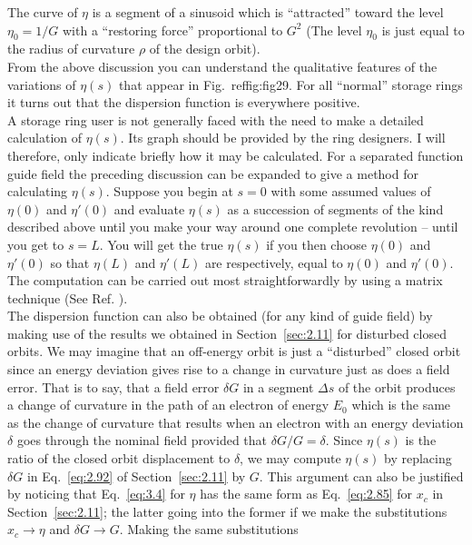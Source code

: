 The curve of $\eta$ is a segment of a sinusoid which is ``attracted'' toward the level
$\eta_0 = 1/G$ with a ``restoring force'' proportional to $G^2$ (The level $\eta_0$ is just equal
to the radius of curvature $\rho$ of the design orbit).\\
From the above discussion you can understand the qualitative features of the variations
 of $\eta(s)$ that appear in Fig.~ref{fig:fig29}. For all ``normal'' storage rings it turns
out that the dispersion function is everywhere positive.\\
A storage ring user is not generally faced with the need to make a detailed calculation of $\eta(s)$. Its graph should be provided by the ring designers. I will therefore, only indicate briefly how it may be calculated. For a separated function guide field the preceding discussion can be expanded to give a method for calculating $\eta(s)$. Suppose you begin at $s = 0$ with some assumed values of $\eta(0)$ and $\eta'(0)$ and evaluate $\eta(s)$ as a succession of segments of the kind described above until you make your way around one complete revolution -- until you get to $s = L$. You will get the true $\eta(s)$ if you then choose $\eta(0)$ and $\eta'(0)$ so that $\eta(L)$ and $\eta'(L)$ are respectively, equal to $\eta(0)$ and $\eta'(0)$. The computation can be carried out most straightforwardly by using a matrix technique (See Ref. \cite{11}).\\
The dispersion function can also be obtained (for any kind of guide field) by making use of the results we obtained in Section~\ref{sec:2.11} for disturbed closed orbits. We may imagine that an off-energy orbit is just a ``disturbed'' closed orbit since an energy deviation gives rise to a change in curvature just as does a field error. That is to say, that a field error $\delta G$ in a segment $\Delta s$ of the orbit produces a change of curvature in the path of an electron of energy $E_0$ which is the same as the change of curvature that results when an electron with an energy deviation $\delta$ goes through the nominal field provided that $\delta G/G = \delta$. Since $\eta(s)$ is the ratio of the closed orbit displacement to $\delta$, we may compute $\eta(s)$ by replacing $\delta G$ in Eq.~\eqref{eq:2.92} of Section~\ref{sec:2.11} by $G$. This argument can also be justified by noticing that Eq.~\eqref{eq:3.4} for $\eta$ has the same form as Eq.~\eqref{eq:2.85} for $x_c$ in Section~\ref{sec:2.11}; the latter going into the former
 if we make the substitutions $x_c \to \eta$ and $\delta G \to G$. Making the same substitutions
